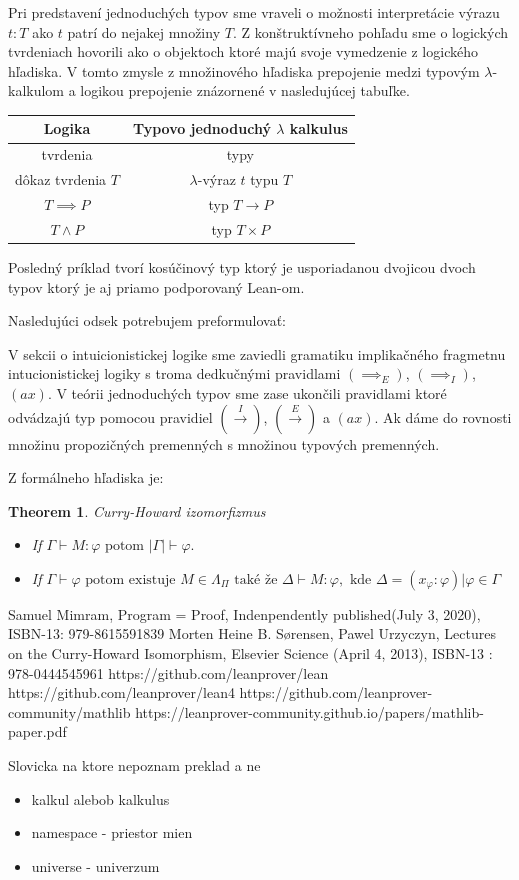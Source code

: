 \documentclass[a4paper,10pt,oneside]{report}%
\newtheorem{theorem}{Theorem}
\begin{document}
    Pri predstavení jednoduchých typov sme vraveli o možnosti interpretácie výrazu
$t : T$ ako $t$ patrí do nejakej množiny $T$.
    Z konštruktívneho pohľadu sme o logických tvrdeniach hovorili ako o objektoch
ktoré majú svoje vymedzenie z logického hľadiska.
    V tomto zmysle z množinového hľadiska prepojenie medzi typovým $\lambda$-kalkulom
a logikou prepojenie znázornené v nasledujúcej tabuľke.
\begin{center}
    \begin{tabular}{ c c }
        Logika &                Typovo jednoduchý $\lambda$ kalkulus \\
        \hline
        tvrdenia                & typy \\
        dôkaz tvrdenia $T$      & $\lambda$-výraz $t$ typu $T$ \\
        $T \implies P$          & typ $T \to P$ \\
        $T \wedge P$            & typ $T \times P$
    \end{tabular}
\end{center}
    Posledný príklad tvorí kosúčinový typ ktorý je usporiadanou dvojicou dvoch typov
ktorý je aj priamo podporovaný Lean-om.

Nasledujúci odsek potrebujem preformulovať:

    V sekcii o intuicionistickej logike sme zaviedli gramatiku implikačného fragmetnu
intucionistickej logiky s troma dedkučnými pravidlami $(\implies_{E})$,
    $(\implies_{I})$, $(ax)$.
    V teórii jednoduchých typov sme zase ukončili pravidlami ktoré odvádzajú
typ pomocou pravidiel $(\overset{I}{\rightarrow})$, $(\overset{E}{\rightarrow})$ a $(ax)$.
    Ak dáme do rovnosti množinu propozičných premenných s množinou typových premenných.
    

    Z formálneho hľadiska je:
\begin{theorem}{Curry-Howard izomorfizmus}
    \begin{itemize}
        \item If $\Gamma \vdash M : \varphi \textrm{ potom } |\Gamma|  \vdash \varphi.$
        \item If $\Gamma \vdash \varphi \textrm{ potom existuje } M \in \Lambda_{\Pi}
            \textrm{ také že } \Delta \vdash M : \varphi, \textrm{ kde }
            \Delta = { ( x_{\varphi} : \varphi ) | \varphi \in \Gamma }$
    \end{itemize}
\end{theorem}

\begin{thebibliography}{xx}
     Samuel Mimram, Program = Proof, Indenpendently published(July 3, 2020), ISBN-13: 979-8615591839
     Morten Heine B. Sørensen, Pawel Urzyczyn, Lectures on the Curry-Howard Isomorphism,
        Elsevier Science (April 4, 2013),  ISBN-13 : 978-0444545961
     https://github.com/leanprover/lean
     https://github.com/leanprover/lean4
     https://github.com/leanprover-community/mathlib
     https://leanprover-community.github.io/papers/mathlib-paper.pdf
\end{thebibliography}

Slovicka na ktore nepoznam preklad a ne
\begin{itemize}
    \item kalkul alebob kalkulus
    \item namespace - priestor mien
    \item universe - univerzum
\end{itemize}
\end{document}
